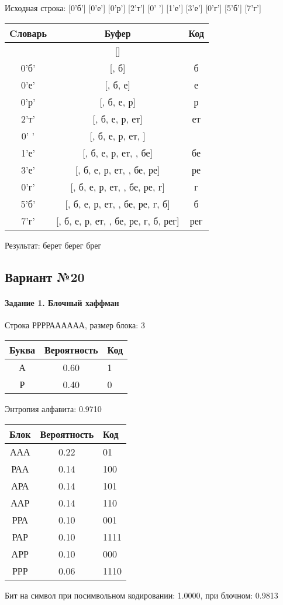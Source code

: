 \documentclass[a4paper, 12pt]{article}
\begin{document}
Исходная строка: [0'б'] [0'е'] [0'р'] [2'т'] [0' '] [1'е'] [3'е'] [0'г'] [5'б'] [7'г']\\
\begin{table}[h!]
\centering
\begin{tabular}{|c|c|c|}
\hline
 Cловарь & Буфер & Код  \\ \hline
 & [] & 
\\ \hline
0'б' & [, б] & б
\\ \hline
0'е' & [, б, е] & е
\\ \hline
0'р' & [, б, е, р] & р
\\ \hline
2'т' & [, б, е, р, ет] & ет
\\ \hline
0' ' & [, б, е, р, ет,  ] &  
\\ \hline
1'е' & [, б, е, р, ет,  , бе] & бе
\\ \hline
3'е' & [, б, е, р, ет,  , бе, ре] & ре
\\ \hline
0'г' & [, б, е, р, ет,  , бе, ре, г] & г
\\ \hline
5'б' & [, б, е, р, ет,  , бе, ре, г,  б] &  б
\\ \hline
7'г' & [, б, е, р, ет,  , бе, ре, г,  б, рег] & рег
\\ \hline
\end{tabular}
\end{table}

Результат: берет берег брег
\pagebreak
\subsection{Вариант №20}
\paragraph{Задание 1. Блочный хаффман \\}

Строка РРРРАААААА, размер блока: 3
\begin{center}
 \begin{tabular}{ |c|c|l| } 
  \hline
     Буква & Вероятность & Код\\ \hline
А & 0.60 & 1\\\hline
Р & 0.40 & 0
\\ \hline \end{tabular}
\end{center}
Энтропия алфавита: 0.9710
\begin{center}
 \begin{tabular}{ |c|c|l| } 
  \hline
     Блок & Вероятность & Код\\ \hline
ААА & 0.22 & 01\\\hline
РАА & 0.14 & 100\\\hline
АРА & 0.14 & 101\\\hline
ААР & 0.14 & 110\\\hline
РРА & 0.10 & 001\\\hline
РАР & 0.10 & 1111\\\hline
АРР & 0.10 & 000\\\hline
РРР & 0.06 & 1110
\\ \hline \end{tabular}
\end{center}
Бит на символ при посимвольном кодировании: 1.0000, при блочном: 0.9813
\end{document}
